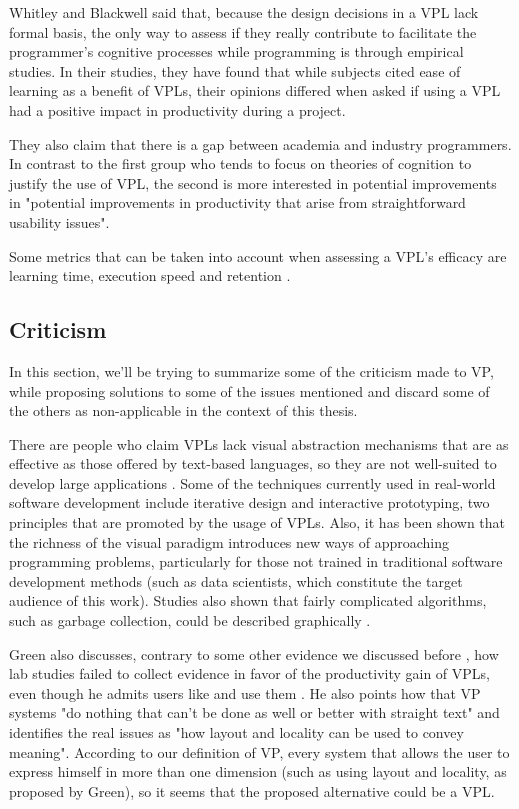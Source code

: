 Whitley and Blackwell \cite{Whitley1997} said that, because the design decisions
in a VPL lack formal basis, the only way to assess if they really contribute
to facilitate the programmer's cognitive processes while programming is through
empirical studies. In their studies, they have found that while subjects
cited ease of learning as a benefit of VPLs, their opinions differed when asked
if using a VPL had a positive impact in productivity during a project.

They also claim that there is a gap between academia and industry programmers.
In contrast to the first group who tends to focus on theories of cognition to justify the use
of VPL, the second is more interested in potential improvements in "potential
improvements in productivity that arise from straightforward usability issues".

Some metrics that can be taken into account when assessing a VPL's efficacy
are learning time, execution speed and retention \cite{Myers1990}.

\subsection{Criticism}
\label{sec:crit}

In this section, we'll be trying to summarize some of the criticism made to VP,
while proposing solutions to some of the issues mentioned and discard some of
the others as non-applicable in the context of this thesis.

There are people who claim VPLs lack visual abstraction mechanisms that are as effective
as those offered by text-based languages, so they are not well-suited to develop
large applications \cite{JamalRahmanandWenzel2014}. Some of the techniques
currently used in real-world software development include iterative design and
interactive prototyping, two principles that are promoted by the usage of VPLs.
Also, it has been shown that the richness of the visual paradigm
introduces new ways of approaching programming problems, particularly for
those not trained in traditional software development methods \cite{JamalRahmanandWenzel2014}
(such as data scientists, which constitute the target audience of this work).
Studies also shown that fairly complicated algorithms, such as garbage collection,
could be described graphically \cite{Myers1990}.

Green also discusses, contrary to some other evidence we discussed before \cite{Cardellini2002}\cite{Burnett1999},
how lab studies failed to collect evidence in favor of the productivity gain of
VPLs, even though he admits users like and use them \cite{Shu1988}. He also points
how that VP systems "do nothing that can’t be done as well or better with straight text"
and identifies the real issues as "how layout and locality can be used to convey meaning".
According to our definition of VP, every system that allows the user to express
himself in more than one dimension (such as using layout and locality, as proposed
by Green), so it seems that the proposed alternative could be a VPL.

